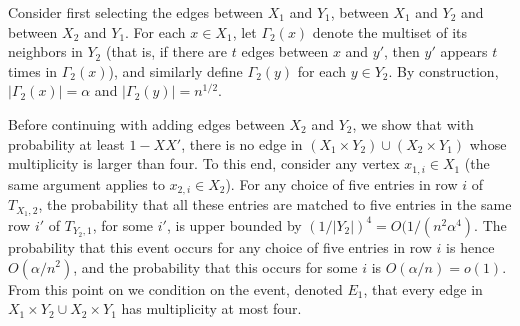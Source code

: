 
Consider first selecting the edges between $X_1$ and $Y_1$, between $X_1$ and $Y_2$ and between $X_2$ and $Y_1$.
For each $x\in X_1$, let $\Gamma_2(x)$ denote the multiset of its neighbors in $Y_2$ (that is, if there are $t$ edges between $x$ and $y'$, then $y'$ appears $t$ times in $\Gamma_2(x)$), and similarly define $\Gamma_2(y)$ for each $y \in Y_2$. By construction, $|\Gamma_2(x)| = \alpha$ and $|\Gamma_2(y)| = n^{1/2}$.

Before continuing with adding edges between $X_2$ and $Y_2$, we show that with probability at least $1-XX'$, there is no edge in $(X_1\times Y_2) \cup (X_2 \times Y_1)$ whose multiplicity is larger than four. To this end, consider any vertex $x_{1,i} \in X_1$ (the same argument applies to $x_{2,i}\in X_2$). For any choice of five entries in row $i$ of $T_{X_1,2}$,
the probability that all these entries are matched to five entries
in the same row $i'$ of  $T_{Y_2,1}$, for some $i'$, is upper bounded by $(1/|Y_2|)^4 = O(1/(n^2\alpha^4)$.
The probability that this event occurs for any choice of five entries in row $i$ is hence $O(\alpha/n^2)$, and the probability that this occurs for some $i$ is $O(\alpha/n) = o(1)$.
From this point on we condition on the event, denoted $E_1$, that every edge in $X_1\times Y_2 \cup X_2 \times Y_1$ has multiplicity at most four.

